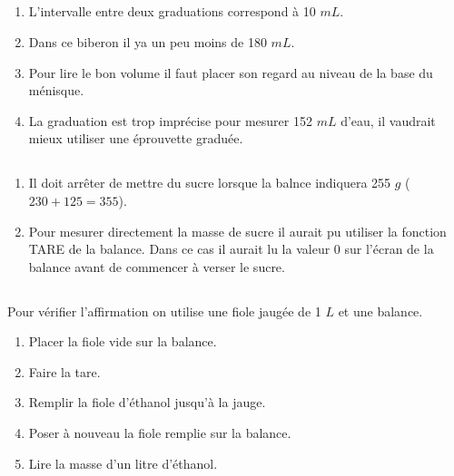 \documentclass[12pt,a4paper]{article}
\begin{document}
\newpage
\subsection*{}

	\begin{enumerate}[label=\alph*)]
		\item L'intervalle entre deux graduations correspond à 10 $mL$.
		\item Dans ce biberon il ya un peu moins de 180 $mL$.
		\item Pour lire le bon volume il faut placer son regard au niveau de la base du ménisque.
		\item La graduation est trop imprécise pour mesurer 152 $mL$ d'eau, il vaudrait mieux utiliser une éprouvette graduée.
	\end{enumerate}


\subsection*{}


\begin{enumerate}[label=\alph*)]
	\item Il doit arrêter de mettre du sucre lorsque la balnce indiquera 255 $g$ ($230 + 125 = 355$).
	\item Pour mesurer directement la masse de sucre il aurait pu utiliser la fonction TARE de la balance. Dans ce cas il aurait lu la valeur 0 sur l'écran de la balance avant de commencer à verser le sucre.
\end{enumerate}

\subsection*{}

Pour vérifier l'affirmation on utilise une fiole jaugée de 1 $L$ et une balance.
\begin{enumerate}
	\item Placer la fiole vide sur la balance.
	\item Faire la tare.
	\item Remplir la fiole d'éthanol jusqu'à la jauge.
	\item Poser à nouveau la fiole remplie sur la balance.
	\item Lire la masse d'un litre d'éthanol.
\end{enumerate}


\subsection*{}
\end{document}
